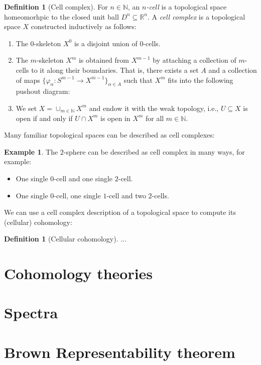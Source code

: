 \documentclass[12pt,a4paper]{amsart}
\theoremstyle{plain}
\theoremstyle{definition}
\newtheorem{defn}[thm]{Definition}
\newtheorem{exmp}[thm]{Example}
\theoremstyle{remark}
\begin{document}
\begin{defn}[Cell complex]
  For $n \in \mathbb{N}$, an \emph{$n$-cell} is a topological space homeomorhpic to the closed unit ball $D^{n} \subseteq \mathbb{R}^{n}$.
  A \emph{cell complex} is a topological space $X$ constructed inductively as follows:
  \begin{enumerate}
    \item The $0$-skeleton $X^{0}$ is a disjoint union of $0$-cells.
    \item The $m$-skeleton $X^{m}$ is obtained from $X^{m-1}$ by attaching a collection of $m$-cells to it along their boundaries.
      That is, there exists a set $A$ and a collection of maps $\{\varphi_{\alpha} \colon S^{m-1} \to X^{m-1}\}_{\alpha \in A}$ such that $X^{m}$ fits into the following pushout diagram:
      \begin{center}
      \end{center}
    \item We set $X = \cup_{m \in \mathbb{N}} X^{m}$ and endow it with the weak topology, i.e., $U \subseteq X$ is open if and only if $U \cap X^{m}$ is open in $X^{m}$ for all $m \in \mathbb{N}$.
  \end{enumerate}
\end{defn}

Many familiar topological spaces can be described as cell complexes:

\begin{exmp}
  The $2$-sphere can be described as cell complex in many ways, for example:
  \begin{itemize}
    \item One single $0$-cell and one single $2$-cell.
    \item One single $0$-cell, one single $1$-cell and two $2$-cells.
  \end{itemize}
\end{exmp}

We can use a cell complex description of a topological space to compute its (cellular) cohomology:

\begin{defn}[Cellular cohomology]
  ...
\end{defn}

\section{Cohomology theories}

\section{Spectra}

\section{Brown Representability theorem}

\printbibliography
\vfill
\end{document}
